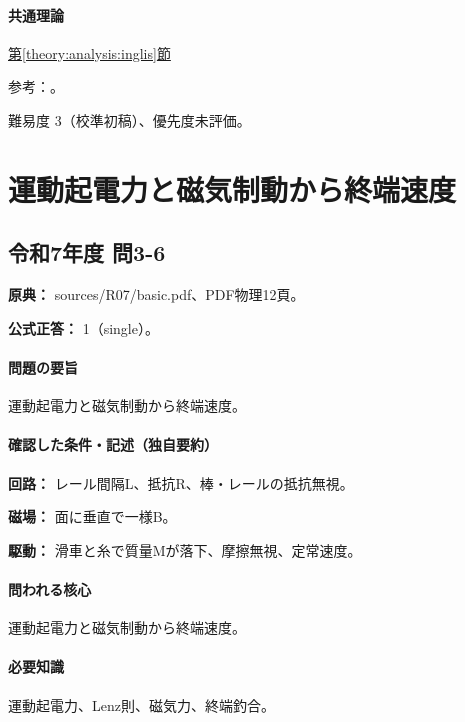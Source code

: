 \paragraph{共通理論} \hyperref[theory:analysis:inglis]{第\ref*{theory:analysis:inglis}節}

\par 参考：\cite{analysis57_inglis}。

\par 難易度 3（校準初稿）、優先度未評価。

\section{運動起電力と磁気制動から終端速度}

\subsection{令和7年度 問3-6}
\label{q:r07-reg-basic-3-6}

\noindent\textbf{原典：} sources/R07/basic.pdf、PDF物理12頁。

\textbf{公式正答：} 1（single）。

\paragraph{問題の要旨} 運動起電力と磁気制動から終端速度。

\paragraph{確認した条件・記述（独自要約）}\mbox{}\par

\noindent\textbf{回路：} レール間隔L、抵抗R、棒・レールの抵抗無視。\par

\noindent\textbf{磁場：} 面に垂直で一様B。\par

\noindent\textbf{駆動：} 滑車と糸で質量Mが落下、摩擦無視、定常速度。\par

\paragraph{問われる核心} 運動起電力と磁気制動から終端速度。

\paragraph{必要知識} 運動起電力、Lenz則、磁気力、終端釣合。

